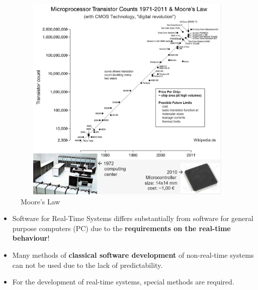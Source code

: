 

\begin{figure}[h]
    \centering
    \includegraphics[width=13cm, height=10cm]{Images/image9.png}
    \caption{Moore's Law}
    \label{fig:Fig 2}
\end{figure}

\os{\newpage}
\os{\vspace{0.5cm}}
\begin{itemize}
\item Software for Real-Time Systems differs substantially from software for general purpose computers (PC) due to the \textbf{requirements on the real-time behaviour}!

\item Many methods of \textbf{classical software development} of non-real-time systems can not be used due to the lack of predictability.

\item For the development of real-time systems, special methods are required.

\end{itemize}

